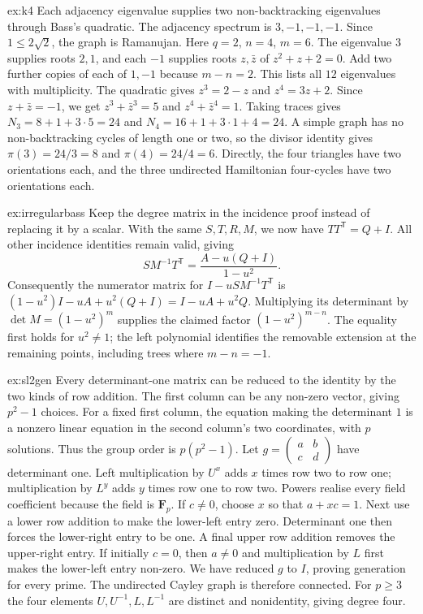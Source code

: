 \begin{solution}{ex:k4}
\idea Each adjacency eigenvalue supplies two non-backtracking eigenvalues through Bass's quadratic.
\writeup The adjacency spectrum is $3,-1,-1,-1$. Since $1\le2\sqrt2$, the graph is Ramanujan. Here $q=2$, $n=4$, $m=6$. The eigenvalue $3$ supplies roots $2,1$, and each $-1$ supplies roots $z,\bar z$ of $z^2+z+2=0$. Add two further copies of each of $1,-1$ because $m-n=2$. This lists all $12$ eigenvalues with multiplicity.
The quadratic gives $z^3=2-z$ and $z^4=3z+2$. Since $z+\bar z=-1$, we get $z^3+\bar z^3=5$ and $z^4+\bar z^4=1$. Taking traces gives $N_3=8+1+3\cdot5=24$ and $N_4=16+1+3\cdot1+4=24$. A simple graph has no non-backtracking cycles of length one or two, so the divisor identity gives $\pi(3)=24/3=8$ and $\pi(4)=24/4=6$. Directly, the four triangles have two orientations each, and the three undirected Hamiltonian four-cycles have two orientations each.
\end{solution}

\begin{solution}{ex:irregularbass}
\idea Keep the degree matrix in the incidence proof instead of replacing it by a scalar.
\writeup With the same $S,T,R,M$, we now have $TT^{\mathsf T}=Q+I$. All other incidence identities remain valid, giving
\[
SM^{-1}T^{\mathsf T}=\frac{A-u(Q+I)}{1-u^2}.
\]
Consequently the numerator matrix for $I-uSM^{-1}T^{\mathsf T}$ is
$(1-u^2)I-uA+u^2(Q+I)=I-uA+u^2Q$.
Multiplying its determinant by $\det M=(1-u^2)^m$ supplies the claimed factor $(1-u^2)^{m-n}$. The equality first holds for $u^2\ne1$; the left polynomial identifies the removable extension at the remaining points, including trees where $m-n=-1$.
\end{solution}

\begin{solution}{ex:sl2gen}
\idea Every determinant-one matrix can be reduced to the identity by the two kinds of row addition.
\writeup The first column can be any non-zero vector, giving $p^2-1$ choices. For a fixed first column, the equation making the determinant $1$ is a nonzero linear equation in the second column's two coordinates, with $p$ solutions. Thus the group order is $p(p^2-1)$.
Let $g=\begin{pmatrix}a&b\\c&d\end{pmatrix}$ have determinant one. Left multiplication by $U^x$ adds $x$ times row two to row one; multiplication by $L^y$ adds $y$ times row one to row two. Powers realise every field coefficient because the field is $\mathbf F_p$. If $c\ne0$, choose $x$ so that $a+xc=1$. Next use a lower row addition to make the lower-left entry zero. Determinant one then forces the lower-right entry to be one. A final upper row addition removes the upper-right entry. If initially $c=0$, then $a\ne0$ and multiplication by $L$ first makes the lower-left entry non-zero. We have reduced $g$ to $I$, proving generation for every prime. The undirected Cayley graph is therefore connected. For $p\ge3$ the four elements $U,U^{-1},L,L^{-1}$ are distinct and nonidentity, giving degree four.
\end{solution}

